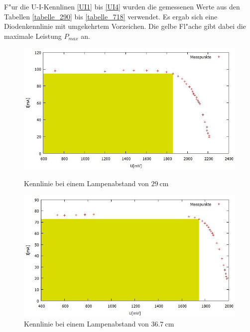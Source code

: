 	F"ur die U-I-Kennlinen \eqref{UI1} bis \eqref{UI4} wurden die gemessenen Werte aus den Tabellen \eqref{tabelle_290} bis \eqref{tabelle_718} verwendet.
	Es ergab sich eine Diodenkennlinie mit umgekehrtem Vorzeichen.
	Die gelbe Fl"ache gibt dabei die maximale Leistung $P_{max}$ an.\\

	
	
	
	

	\begin{figure}[htbp]
		\centering
		\includegraphics[width = 12cm]{img/290.jpg}
		\caption{Kennlinie bei einem Lampenabstand von $\SI{29}{\centi\meter}$}
		\label{UI1}

		\centering
		\includegraphics[width = 12cm]{img/367.jpg}
		\caption{Kennlinie bei einem Lampenabstand von $\SI{36.7}{\centi\meter}$}
		\label{UI2}
	\end{figure}
